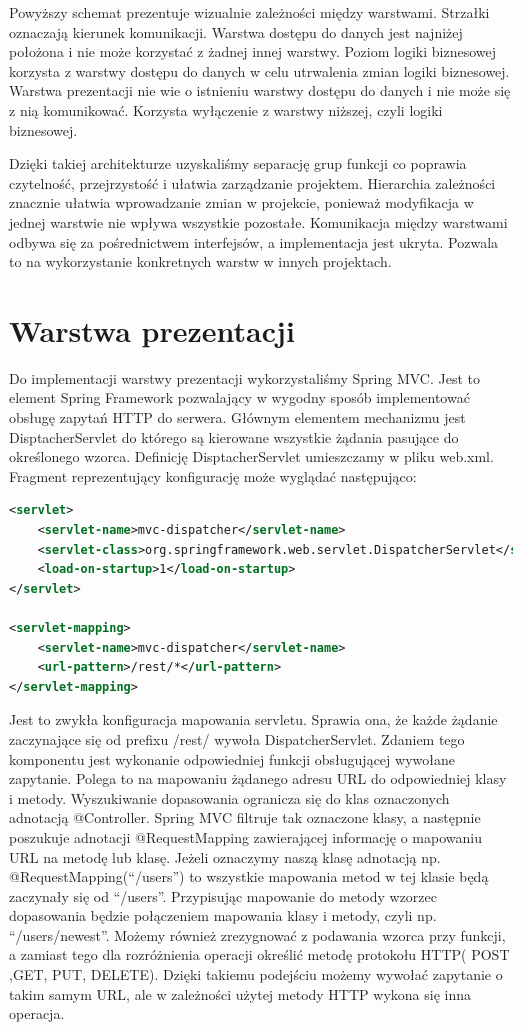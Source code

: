 Powyższy schemat prezentuje wizualnie zależności między warstwami. Strzałki oznaczają kierunek komunikacji. Warstwa dostępu do danych jest najniżej położona i nie może korzystać z żadnej innej warstwy. Poziom logiki biznesowej korzysta z warstwy dostępu do danych w celu utrwalenia zmian logiki biznesowej. Warstwa prezentacji nie wie o istnieniu warstwy dostępu do danych i nie może się z nią komunikować. Korzysta wyłączenie z warstwy niższej, czyli logiki biznesowej.

Dzięki takiej architekturze uzyskaliśmy separację grup funkcji co poprawia czytelność, przejrzystość i ułatwia zarządzanie projektem. Hierarchia zależności znacznie ułatwia wprowadzanie zmian w projekcie, ponieważ modyfikacja w jednej warstwie nie wpływa wszystkie pozostałe. Komunikacja między warstwami odbywa się za pośrednictwem interfejsów, a implementacja jest ukryta. Pozwala to na wykorzystanie konkretnych warstw w innych projektach.


\section{Warstwa prezentacji}

Do implementacji warstwy prezentacji wykorzystaliśmy Spring MVC. Jest to element Spring Framework pozwalający w wygodny sposób implementować obsługę zapytań HTTP do serwera. Głównym elementem mechanizmu jest DisptacherServlet do którego są kierowane wszystkie żądania pasujące do określonego wzorca. Definicję DisptacherServlet umieszczamy w pliku web.xml. Fragment reprezentujący konfigurację może wyglądać następująco:

\begin{lstlisting}[frame=single,language=XML]
<servlet>
	<servlet-name>mvc-dispatcher</servlet-name>
	<servlet-class>org.springframework.web.servlet.DispatcherServlet</servlet-class>
	<load-on-startup>1</load-on-startup>
</servlet>

<servlet-mapping>
	<servlet-name>mvc-dispatcher</servlet-name>
	<url-pattern>/rest/*</url-pattern>
</servlet-mapping>
\end{lstlisting}


Jest to zwykła konfiguracja mapowania servletu. Sprawia ona, że każde żądanie zaczynające się od prefixu /rest/ wywoła DispatcherServlet. Zdaniem tego komponentu jest wykonanie odpowiedniej funkcji obsługującej wywołane zapytanie. Polega to na mapowaniu żądanego adresu URL do odpowiedniej klasy i metody. Wyszukiwanie dopasowania ogranicza się do klas oznaczonych adnotacją @Controller. Spring MVC filtruje tak oznaczone klasy, a następnie poszukuje adnotacji @RequestMapping zawierającej informację o mapowaniu URL na metodę lub klasę. Jeżeli oznaczymy naszą klasę adnotacją np. @RequestMapping(“/users”) to wszystkie mapowania metod w tej klasie będą zaczynały się od “/users”. Przypisując mapowanie do metody wzorzec dopasowania będzie połączeniem mapowania klasy i metody, czyli np. “/users/newest”. Możemy również zrezygnować z podawania wzorca przy funkcji, a zamiast tego dla rozróżnienia operacji określić metodę protokołu HTTP( POST ,GET, PUT, DELETE). Dzięki takiemu podejściu możemy wywołać zapytanie o takim samym URL, ale w zależności użytej metody HTTP wykona się inna operacja. 

